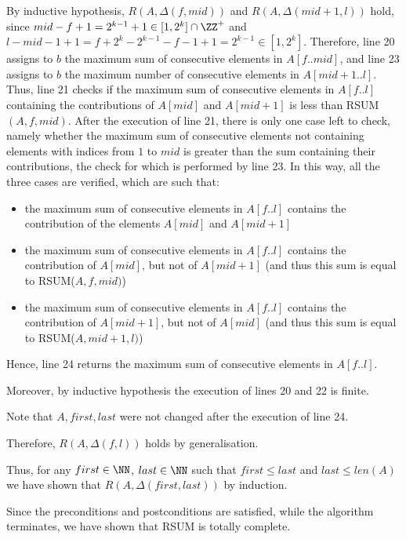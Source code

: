 \documentclass[11pt]{scrartcl}
\begin{document}
By inductive hypothesis, $R(A, \Delta(f, mid))$ and $R(A, \Delta(mid + 1, l))$ hold,
since $mid-f+1 = 2^{k-1}+1 \in [1, 2^k]\cap \ZZ^+$ and
$l-mid-1+1 = f+2^k-2^{k-1}-f-1+1 = 2^{k-1} \in [1, 2^k]$. Therefore,
line 20 assigns to $b$ the maximum sum of consecutive elements in
$A[f..mid]$, and line 23 assigns to $b$ the maximum number of
consecutive elements in $A[mid+1..l]$. Thus, line 21 checks if the
maximum sum of consecutive elements in $A[f..l]$ containing the
contributions of $A[mid]$ and $A[mid+1]$ is less than
RSUM$(A, f, mid)$. After the execution of line 21, there is only one
case left to check, namely whether the maximum sum of consecutive
elements not containing elements with indices from $1$ to $mid$ is
greater than the sum containing their contributions, the check for
which is performed by line 23. In this way, all the three cases are
verified, which are such that:
\begin{itemize}
\item the maximum sum of consecutive elements in $A[f..l]$ contains the contribution of the elements $A[mid]$ and $A[mid+1]$
\item the maximum sum of consecutive elements in $A[f..l]$ contains the contribution of  $A[mid]$, but not of $A[mid+1]$ (and thus this sum is equal to RSUM($A, f, mid)$)
\item the maximum sum of consecutive elements in $A[f..l]$ contains
  the contribution of $A[mid+1]$, but not of $A[mid]$ (and thus this
  sum is equal to RSUM($A, mid+1, l)$)
\end{itemize}

Hence, line 24 returns the maximum sum of consecutive elements in $A[f..l]$.

Moreover, by inductive hypothesis the execution of lines 20 and 22 is finite.

Note that $A, first, last$ were not changed after the execution of line 24. 

Therefore, $R(A, \Delta(f, l))$ holds by generalisation. 

Thus, for any $first\in\NN$, $last\in\NN$ such that $first \leq last$
and $last\leq len(A)$ we have shown that $R(A, \Delta(first, last))$
by induction.

Since the preconditions and postconditions are satisfied, while the
algorithm terminates, we have shown that RSUM is totally complete.
\end{document}
